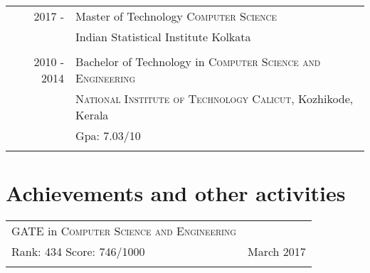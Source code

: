 \documentclass[a4paper,10pt]{article} %
\begin{document}
\begin{tabular}{rl}
        \textsc{2017 - }  & \textsf{Master of Technology} \textsc{Computer Science}\\
                           & \textsf{Indian Statistical Institute Kolkata}\\
                           &\\

        \textsc{2010 - 2014}  & \textsf{Bachelor of Technology in} \textsc{Computer Science and Engineering}\\
                           & \textsc{National Institute of Technology Calicut}, \textsf{Kozhikode, Kerala}\\
                           & \textsf{Gpa: 7.03/10}\\
                           &\\

%
\end{tabular}



\section{Achievements and other activities}

\begin{tabular}{p{11cm}p{11cm}}
\textsf{GATE in} \textsc{Computer Science and Engineering} \\ \textsf{Rank: 434 Score: 746/1000} & \textsf{March 2017}  \\ \\
\end{tabular}
\end{document}
